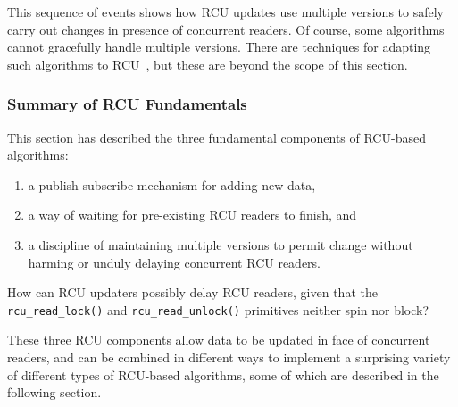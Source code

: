 This sequence of events shows how RCU updates use multiple versions
to safely carry out changes in presence of concurrent readers.
Of course, some algorithms cannot gracefully handle multiple versions.
There are techniques
for adapting such algorithms to RCU~\cite{PaulEdwardMcKenneyPhD},
but these are beyond the scope of this section.

\subsubsection{Summary of RCU Fundamentals}
\label{sec:defer:Summary of RCU Fundamentals}

This section has described the three fundamental components of RCU-based
algorithms:

\begin{enumerate}
\item	a publish-subscribe mechanism for adding new data,

\item	a way of waiting for pre-existing RCU readers to finish, and

\item	a discipline of maintaining multiple versions to permit
	change without harming or unduly delaying concurrent RCU readers.
\end{enumerate}

\QuickQuiz{}
	How can RCU updaters possibly delay RCU readers, given that the
	{\tt rcu\_read\_lock()} and {\tt rcu\_read\_unlock()}
	primitives neither spin nor block?
 \QuickQuizEnd

These three RCU components
allow data to be updated in face of concurrent readers, and
can be combined in different ways to
implement a surprising variety of different types of RCU-based algorithms,
some of which are described in the following section.
